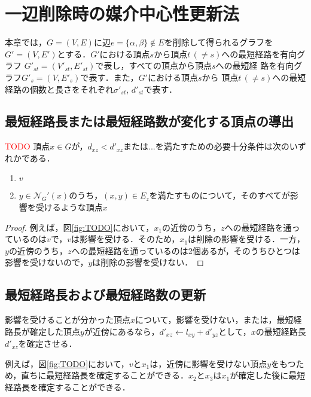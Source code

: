 \chapter{一辺削除時の媒介中心性更新法}
\label{chap:update-bc-on-delete}
本章では，$G=(V,E)$に辺$e=\{\alpha,\beta\} \not\in E$を削除して得られるグラフを
$G'=(V,E')$とする．$G'$における頂点$s$から頂点$t\,(\neq s)$への最短経路を有向グラフ
$G'_{st}=(V'_{st},E'_{st})$で表し，すべての頂点から頂点$s$への最短経
路を有向グラフ$G'_s=(V,E'_s)$で表す．また，$G'$における頂点$s$から
頂点$t\,(\neq s)$への最短経路の個数と長さをそれぞれ$\sigma'_{st}$, 
$d'_{st}$で表す．

\section{最短経路長または最短経路数が変化する頂点の導出}

\begin{lemma}
  \textcolor{red}{TODO}
  頂点$x\in G$が，$d_{xz}<d'_{xz}$または...を満たすための必要十分条件は次のいずれかである．
  \begin{enumerate}
  \item $v$
  \item $y\in\mathcal{N}_G'(x)$のうち，$(x,y)\in E_z$を満たすものについて，そのすべてが影響を受けるような頂点$x$
  \end{enumerate}
\end{lemma}
\begin{proof}
例えば，図\ref{fig:TODO}において，$x_1$の近傍のうち，$z$への最短経路を通っているのは$v$で，$v$は影響を受ける．そのため，$x_1$は削除の影響を受ける．一方，$y$の近傍のうち，$z$への最短経路を通っているのは2個あるが，そのうちひとつは影響を受けないので，$y$は削除の影響を受けない．
\end{proof}

\section{最短経路長および最短経路数の更新}

\begin{lemma}
  影響を受けることが分かった頂点$x$について，影響を受けない，または，最短経路長が確定した頂点$y$が近傍にあるなら，$d'_{xz}\gets l_{xy}+d'_{yz}$として，$x$の最短経路長$d'_{xz}$を確定させる．
\end{lemma}

例えば，図\ref{fig:TODO}において，$v$と$x_1$は，近傍に影響を受けない頂点$y$をもつため，直ちに最短経路長を確定することができる．$x_2$と$x_3$は$x_1$が確定した後に最短経路長を確定することができる．

